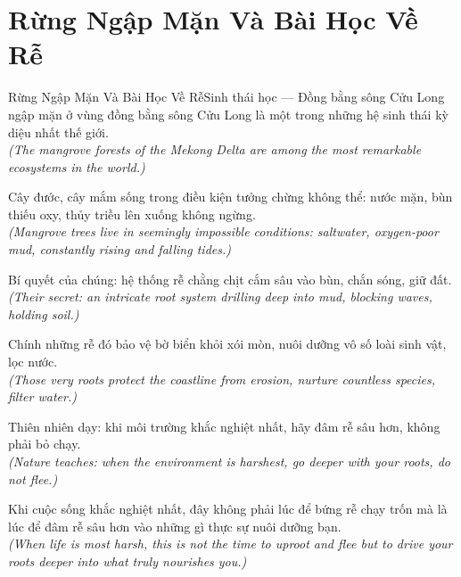 \section{Rừng Ngập Mặn Và Bài Học Về Rễ}
\begin{truyen}{Rừng Ngập Mặn Và Bài Học Về Rễ}{Sinh thái học --- Đồng bằng sông Cửu Long}
 ngập mặn ở vùng đồng bằng sông Cửu Long là một trong những hệ sinh thái kỳ diệu nhất thế giới.\\[4pt]
\textit{(The mangrove forests of the Mekong Delta are among the most remarkable ecosystems in the world.)}

Cây đước, cây mắm sống trong điều kiện tưởng chừng không thể: nước mặn, bùn thiếu oxy, thủy triều lên xuống không ngừng.\\[4pt]
\textit{(Mangrove trees live in seemingly impossible conditions: saltwater, oxygen-poor mud, constantly rising and falling tides.)}

Bí quyết của chúng: hệ thống rễ chằng chịt cắm sâu vào bùn, chắn sóng, giữ đất.\\[4pt]
\textit{(Their secret: an intricate root system drilling deep into mud, blocking waves, holding soil.)}

Chính những rễ đó bảo vệ bờ biển khỏi xói mòn, nuôi dưỡng vô số loài sinh vật, lọc nước.\\[4pt]
\textit{(Those very roots protect the coastline from erosion, nurture countless species, filter water.)}

Thiên nhiên dạy: khi môi trường khắc nghiệt nhất, hãy đâm rễ sâu hơn, không phải bỏ chạy.\\[4pt]
\textit{(Nature teaches: when the environment is harshest, go deeper with your roots, do not flee.)}

\end{truyen}
\begin{baihoc}
  Khi cuộc sống khắc nghiệt nhất, đây không phải lúc để bứng rễ chạy trốn mà là lúc để đâm rễ sâu hơn vào những gì thực sự nuôi dưỡng bạn.\\[4pt]
  \textit{(When life is most harsh, this is not the time to uproot and flee but to drive your roots deeper into what truly nourishes you.)}
\end{baihoc}

